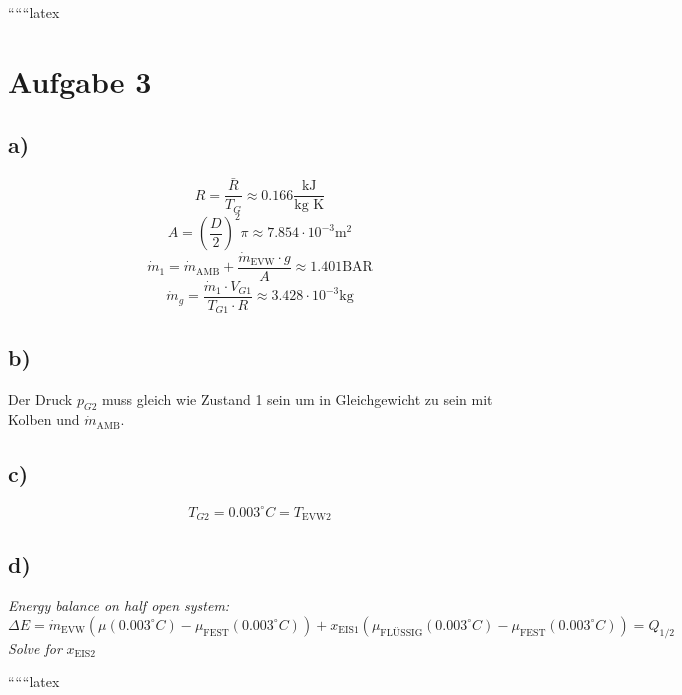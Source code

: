 
``````latex


\section*{Aufgabe 3}

\subsection*{a)}
\begin{equation*}
    R = \frac{\bar{R}}{T_G} \approx 0.166 \frac{\text{kJ}}{\text{kg K}}
\end{equation*}
\begin{equation*}
    A = \left(\frac{D}{2}\right)^2 \pi \approx 7.854 \cdot 10^{-3} \text{m}^2
\end{equation*}
\begin{equation*}
    \dot{m}_1 = \dot{m}_{\text{AMB}} + \frac{\dot{m}_{\text{EVW}} \cdot g}{A} \approx 1.401 \text{BAR}
\end{equation*}
\begin{equation*}
    \dot{m}_g = \frac{\dot{m}_1 \cdot V_{G1}}{T_{G1} \cdot R} \approx 3.428 \cdot 10^{-3} \text{kg}
\end{equation*}

\subsection*{b)}
Der Druck $p_{G2}$ muss gleich wie Zustand 1 sein um in Gleichgewicht zu sein mit Kolben und $\dot{m}_{\text{AMB}}$.

\subsection*{c)}
\begin{equation*}
    T_{G2} = 0.003^\circ C = T_{\text{EVW2}}
\end{equation*}

\subsection*{d)}
\textit{Energy balance on half open system:}
\begin{equation*}
    \Delta E = \dot{m}_{\text{EVW}} \left( \mu(0.003^\circ C) - \mu_{\text{FEST}} (0.003^\circ C) \right) + x_{\text{EIS1}} \left( \mu_{\text{FLÜSSIG}} (0.003^\circ C) - \mu_{\text{FEST}} (0.003^\circ C) \right) = Q_{1/2}
\end{equation*}
\textit{Solve for } $x_{\text{EIS2}}$

``````latex


